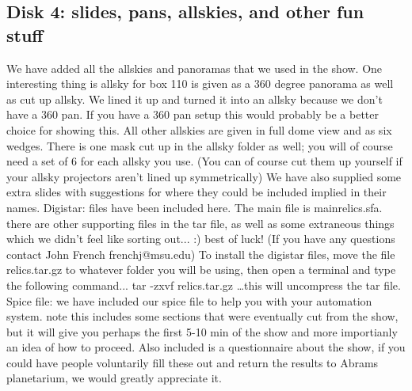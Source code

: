 \documentclass{article}
\begin{document}
\subsection{Disk 4: slides, pans, allskies, and other fun stuff}
We have added all the allskies and panoramas that we used in the show. One interesting thing is allsky for box 110 is given as a 360 degree panorama as well as cut up allsky. We lined it up and turned it into an allsky because we don't have a 360 pan. If you have a 360 pan setup this would probably be a better choice for showing this. All other allskies are given in full dome view and as six wedges. There is one mask cut up in the allsky folder as well; you will of course need a set of 6 for each allsky you use. (You can of course cut them up yourself if your allsky projectors aren't lined up symmetrically) 
\newline
\newline
We have also supplied some extra slides with suggestions for where they could be included implied in their names. 
\newline
\newline
Digistar: files have been included here. The main file is mainrelics.sfa. there are other supporting files in the tar file, as well as some extraneous things which we didn't feel like sorting out... :) best of luck! (If you have any questions contact John French frenchj@msu.edu) 
\newline
To install the digistar files, move the file relics.tar.gz to whatever folder you will be using, then open a terminal and type the following command...
\newline
\newline
tar -zxvf relics.tar.gz
\newline
\newline
…this will uncompress the tar file. 
\newline
\newline
Spice file: we have included our spice file to help you with your automation system. note this includes some sections that were eventually cut from the show, but it will give you perhaps the first 5-10 min of the show and more importianly an idea of how to proceed. 
\newline
\newline
Also included is a questionnaire about the show, if you could have people voluntarily fill these out and return the results to Abrams planetarium, we would greatly appreciate it. 
\end{document}
